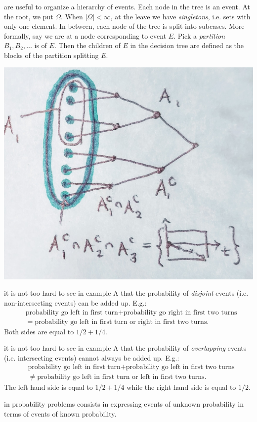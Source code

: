 \documentclass{article}
\begin{document}
 are useful to organize a hierarchy of events. Each node in the tree is an event. At the root, we put $\Omega$. When $|\Omega| < \infty$, at the leave we have \emph{singletons}, i.e. sets with only one element. In between, each node of the tree is split into subcases. More formally, say we are at a node corresponding to event $E$. Pick a \emph{partition} $B_1, B_2, \dots$ is of $E$. Then the children of $E$ in the decision tree are defined as the blocks of the partition splitting $E$.
\begin{center}
	\includegraphics[width=0.5\linewidth]{figures/decision-tree}
\end{center}

 it is not too hard to see in example A that the probability of \emph{disjoint} events (i.e. non-intersecting events) can be added up. E.g.:
\begin{align*} 
&\text{probability go left in first turn} + \text{probability go right in first two turns} \\ 
&= \text{probability go left in first turn or right in first two turns}. 
\end{align*} 
Both sides are equal to $1/2 + 1/4$.

 it is not too hard to see in example A that the probability of \emph{overlapping} events (i.e. intersecting events) cannot always be added up. E.g.:
\begin{align*} 
	&\text{probability go left in first turn} + \text{probability go left in first two turns} \\
	&\neq \text{probability go left in first turn or left in first two turns}.
\end{align*}
The left hand side is equal to $1/2 + 1/4$ while the right hand side is equal to $1/2$. 

 in probability problems consists in expressing events of unknown probability in terms of events of known probability. 
\end{document}
